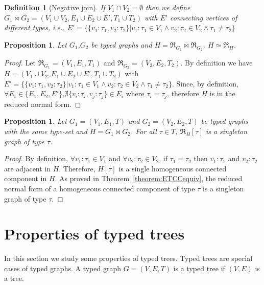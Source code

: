 \documentclass[preprint,12pt]{elsarticle}
\theoremstyle{plain}
\newtheorem{prop}[theorem]{Proposition}
\newtheorem{definition}[theorem]{Definition}
\newcommand\tyv[2]{#1\!\!:\!\!#2}
\begin{document}
\begin{definition}[Negative join]
If $V_1\cap V_2=\emptyset$ then we define
$G_1\overline{\Join}G_2 = (V_1\cup V_2, E_1\cup E_2\cup E', T_1\cup T_2)$
with $E'$ connecting vertices of different types, i.e.,
$E' = \{\{\tyv{v_1}{\tau_1}, \tyv{v_2}{\tau_2}\}|\tyv{v_1}{\tau_1}\in V_1\wedge\tyv{v_2}{\tau_2}\in V_2\wedge \tau_1\neq\tau_2\}$
\end{definition}

\begin{prop}
Let $G_1$,$G_2$
be typed graphs and
$H = \Re_{G_1}\overline{\Join}\Re_{G_2}$.
$H \simeq \Re_H$.
\end{prop}
\begin{proof}
Let $\Re_{G_1} = (V_1,E_1,T_1)$ and $\Re_{G_2} = (V_2,E_2,T_2)$.
By definition we have
$H = (V_1\cup V_2, E_1\cup E_2\cup E', T_1\cup T_2)$
with
$E' = \{\{\tyv{v_1}{\tau_1}, \tyv{v_2}{\tau_2}\}|\tyv{v_1}{\tau_1}\in V_1\wedge\allowbreak\tyv{v_2}{\tau_2}\in V_2\wedge \tau_1\neq\tau_2\}$.
Since, by definition, $\forall E_i\in\{E_1,E_2,E'\}$,$\nexists \{\tyv{v_i}{\tau_i}, \tyv{v_j}{\tau_j}\}\in E_i$ where $\tau_i=\tau_j$,
therefore $H$ is in the reduced normal form.
\end{proof}

\begin{prop}
Let $G_1 = (V_1,E_1,T)$ and $G_2 = (V_2,E_2,T)$
be typed graphs with the same type-set and
$H = G_1 \Join G_2$.
For all $\tau\in T$, $\Re_H[\tau]$
is a singleton graph of type $\tau$.
\end{prop}
\begin{proof}
By definition, $\forall \tyv{v_1}{\tau_1}\in V_1$
and $\forall \tyv{v_2}{\tau_2}\in V_2$,
if $\tau_1=\tau_2$ then 
$\tyv{v_1}{\tau_1}$ and
$\tyv{v_2}{\tau_2}$ are adjacent in $H$.
Therefore, $H[\tau]$ is a single
homogeneous connected component in $H$.
As proved in Theorem~\ref{theorem:ETCCequiv},
the reduced normal form of a
homogeneous connected component of type $\tau$ is
a singleton graph of type $\tau$.
\end{proof}

\section{Properties of typed trees}

In this section we study some properties of typed trees.
Typed trees are special cases of typed graphs.
A typed graph $G = (V,E,T)$ is a typed tree
if $(V,E)$ is a tree.
\end{document}
